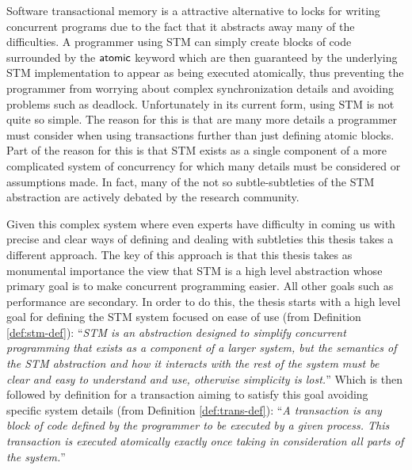 Software transactional memory is a attractive alternative to locks for writing concurrent programs
due to the fact that it abstracts away many of the difficulties.
A programmer using STM can simply create blocks of code surrounded by the $\act{atomic}$
keyword which are then guaranteed by the underlying STM implementation to appear
as being executed atomically,
thus preventing the programmer from worrying about complex synchronization details
and avoiding problems such as deadlock.
Unfortunately in its current form, using STM is not quite so simple.
The reason for this is that are many more details a programmer must consider when using transactions
further than just defining atomic blocks.
Part of the reason for this is that STM exists as a single component of a more complicated
system of concurrency for which many details must be considered or assumptions made.
In fact, many of the not so subtle-subtleties
of the STM abstraction are actively debated by the research community.

Given this complex system where even experts have difficulty in coming us with precise
and clear ways of defining and dealing with
subtleties this thesis takes a different approach.
The key of this approach is that this thesis takes as monumental importance
the view that STM is a high level abstraction whose
primary goal is to make concurrent programming easier.
All other goals such as performance are secondary.
In order to do this, the thesis starts with a high level goal for defining the STM
system focused on ease of use (from Definition \ref{def:stm-def}):
``\emph{STM is an abstraction designed to simplify concurrent programming that exists as a component of a larger system,
but the semantics of the STM abstraction and how it interacts with the rest of the system must be clear and easy to understand and use,
otherwise simplicity is lost.}''
Which is then followed by definition for
a transaction aiming to satisfy this goal avoiding specific system details (from Definition \ref{def:trans-def}):
``\emph{A transaction is any block of
code defined by the programmer to be executed by a given process.
This transaction is executed atomically exactly once
taking in consideration all parts of the system.}''


